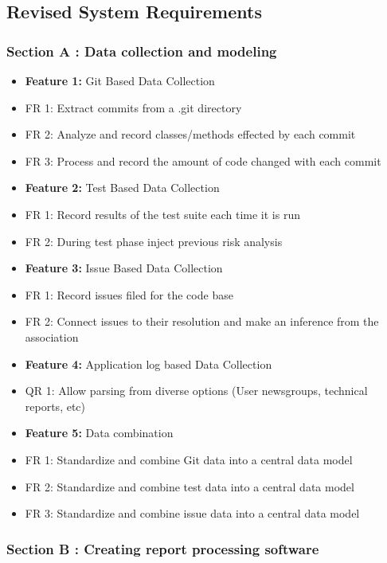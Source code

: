 \documentclass[11pt,]{article}
\begin{document}
\subsection{Revised System
Requirements}\label{revised-system-requirements}

\subsubsection{Section A : Data collection and
modeling}\label{section-a-data-collection-and-modeling}

\begin{itemize}
\item
  \textbf{Feature 1:} Git Based Data Collection
\item
  FR 1: Extract commits from a .git directory
\item
  FR 2: Analyze and record classes/methods effected by each commit
\item
  FR 3: Process and record the amount of code changed with each commit
\item
  \textbf{Feature 2:} Test Based Data Collection
\item
  FR 1: Record results of the test suite each time it is run
\item
  FR 2: During test phase inject previous risk analysis
\item
  \textbf{Feature 3:} Issue Based Data Collection
\item
  FR 1: Record issues filed for the code base
\item
  FR 2: Connect issues to their resolution and make an inference from
  the association
\item
  \textbf{Feature 4:} Application log based Data Collection
\item
  QR 1: Allow parsing from diverse options (User newsgroups, technical
  reports, etc)
\item
  \textbf{Feature 5:} Data combination
\item
  FR 1: Standardize and combine Git data into a central data model
\item
  FR 2: Standardize and combine test data into a central data model
\item
  FR 3: Standardize and combine issue data into a central data model
\end{itemize}

\subsubsection{Section B : Creating report processing
software}\label{section-b-creating-report-processing-software}
\end{document}
